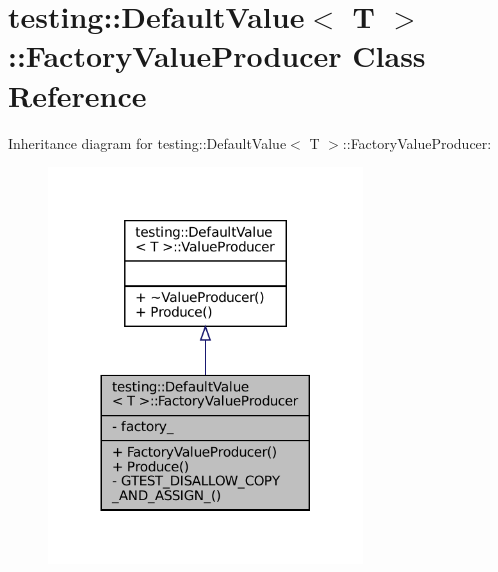 \hypertarget{classtesting_1_1DefaultValue_1_1FactoryValueProducer}{}\section{testing\+:\+:Default\+Value$<$ T $>$\+:\+:Factory\+Value\+Producer Class Reference}
\label{classtesting_1_1DefaultValue_1_1FactoryValueProducer}


Inheritance diagram for testing\+:\+:Default\+Value$<$ T $>$\+:\+:Factory\+Value\+Producer\+:
\nopagebreak
\begin{figure}[H]
\begin{center}
\leavevmode
\includegraphics[width=236pt]{classtesting_1_1DefaultValue_1_1FactoryValueProducer__inherit__graph}
\end{center}
\end{figure}


